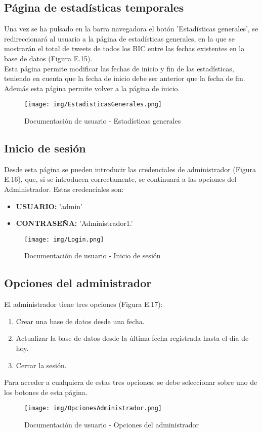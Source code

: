\subsection{Página de estadísticas temporales}
Una vez se ha pulsado en la barra navegadora el botón 'Estadísticas generales', se redireccionará al usuario a la página de estadísticas generales, en la que se mostrarán el total de tweets de todos los BIC entre las fechas existentes en la base de datos (Figura E.15).\\
Esta página permite modificar las fechas de inicio y fin de las estadísticas, teniendo en cuenta que la fecha de inicio debe ser anterior que la fecha de fin.
Además esta página permite volver a la página de inicio.
\begin{figure}[h!]
    \centering
    \texttt{[image: img/EstadisticasGenerales.png]} 
    \caption{Documentación de usuario - Estadísticas generales}
    \label{Documentación de usuario - Estadísticas generales}
\end{figure}
\subsection{Inicio de sesión}
Desde esta página se pueden introducir las credenciales de administrador (Figura E.16), que, si se introducen correctamente,  se continuará a las opciones del Administrador.
Estas credenciales son:
\begin{itemize}
    \item \textbf{USUARIO:} 'admin'
    \item \textbf{CONTRASEÑA:} 'Administrador1.'\\
\end{itemize}
\begin{figure}[h!]
    \centering
    \texttt{[image: img/Login.png]} \\
    \caption{Documentación de usuario - Inicio de sesión}
    \label{Documentación de usuario - Inicio de sesión}
\end{figure}

\subsection{Opciones del administrador}
El administrador tiene tres opciones (Figura E.17):
\begin{enumerate}
    \item Crear una base de datos desde una fecha.
    \item Actualizar la base de datos desde la última fecha registrada hasta el día de hoy.
    \item Cerrar la sesión.
\end{enumerate}
Para acceder a cualquiera de estas tres opciones, se debe seleccionar sobre uno de los botones de esta página.
\begin{figure}[h!]
    \centering
    \texttt{[image: img/OpcionesAdministrador.png]} \\
    \caption{Documentación de usuario - Opciones del administrador}
    \label{Documentación de usuario - Opciones del administrador}
\end{figure}
